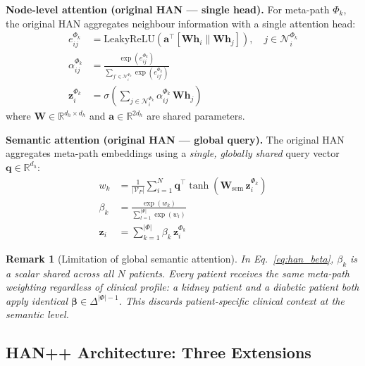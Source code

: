 \documentclass[conference]{IEEEtran}
\newtheorem{remark}{Remark}
\begin{document}
\textbf{Node-level attention (original HAN --- single head).}
For meta-path $\Phi_k$, the original HAN aggregates neighbour information
with a single attention head:
\begin{align}
  e_{ij}^{\Phi_k} &= \text{LeakyReLU}\!\left(
    \mathbf{a}^{\top}\!
    [\mathbf{W}\mathbf{h}_i \| \mathbf{W}\mathbf{h}_j]
    \right),\quad j \in \mathcal{N}_i^{\Phi_k}
    \label{eq:han_eij} \\
  \alpha_{ij}^{\Phi_k} &= \frac{
    \exp(e_{ij}^{\Phi_k})
  }{
    \sum_{j' \in \mathcal{N}_i^{\Phi_k}}
    \exp(e_{ij'}^{\Phi_k})
  }
  \label{eq:han_alpha} \\
  \mathbf{z}_i^{\Phi_k} &= \sigma\!\left(
    \sum_{j \in \mathcal{N}_i^{\Phi_k}}
    \alpha_{ij}^{\Phi_k}\, \mathbf{W}\mathbf{h}_j
    \right)
  \label{eq:han_zi}
\end{align}
where $\mathbf{W} \in \mathbb{R}^{d_h \times d_h}$ and
$\mathbf{a} \in \mathbb{R}^{2d_h}$ are shared parameters.

\textbf{Semantic attention (original HAN --- global query).}
The original HAN aggregates meta-path embeddings using a \emph{single,
globally shared} query vector $\mathbf{q} \in \mathbb{R}^{d_h}$:
\begin{align}
  w_k &= \frac{1}{|\mathcal{V}_P|}\sum_{i=1}^{N}
    \mathbf{q}^{\top}\tanh(\mathbf{W}_{\text{sem}}\,
    \mathbf{z}_i^{\Phi_k})
  \label{eq:han_wk} \\
  \beta_k &= \frac{\exp(w_k)}{\sum_{l=1}^{|\Phi|} \exp(w_l)}
  \label{eq:han_beta} \\
  \mathbf{z}_i &= \sum_{k=1}^{|\Phi|} \beta_k\,
    \mathbf{z}_i^{\Phi_k}
  \label{eq:han_zfinal}
\end{align}

\begin{remark}[Limitation of global semantic attention]
\label{rmk:limitation}
In Eq.~\eqref{eq:han_beta}, $\beta_k$ is a \emph{scalar} shared across
all $N$ patients.
Every patient receives the same meta-path weighting regardless of
clinical profile: a kidney patient and a diabetic patient both apply
identical $\boldsymbol{\beta} \in \Delta^{|\Phi|-1}$.
This discards patient-specific clinical context at the semantic level.
\end{remark}

\subsection{HAN++ Architecture: Three Extensions}
\label{subsec:architecture}
\end{document}
